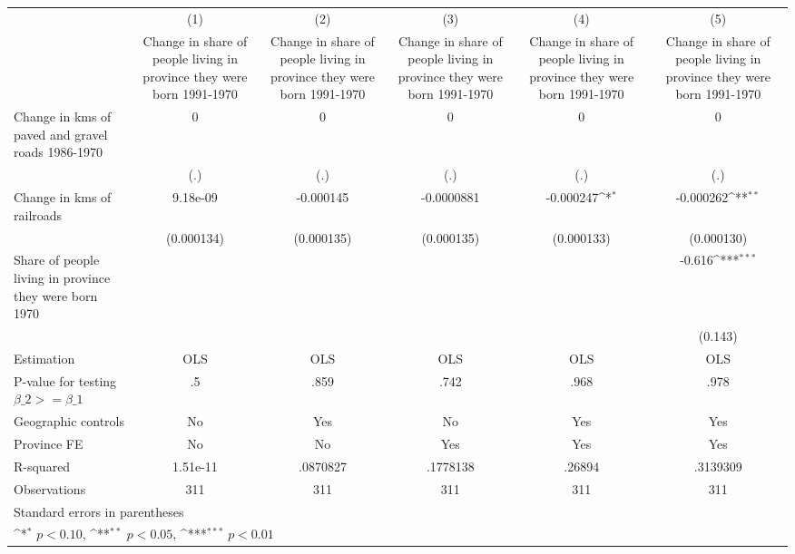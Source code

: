 {
\def\sym#1{\ifmmode^{#1}\else\(^{#1}\)\fi}
\begin{tabular}{l*{5}{c}}
\hline\hline
                    &\multicolumn{1}{c}{(1)}&\multicolumn{1}{c}{(2)}&\multicolumn{1}{c}{(3)}&\multicolumn{1}{c}{(4)}&\multicolumn{1}{c}{(5)}\\
                    &\multicolumn{1}{c}{Change in share of people living in province they were born 1991-1970}&\multicolumn{1}{c}{Change in share of people living in province they were born 1991-1970}&\multicolumn{1}{c}{Change in share of people living in province they were born 1991-1970}&\multicolumn{1}{c}{Change in share of people living in province they were born 1991-1970}&\multicolumn{1}{c}{Change in share of people living in province they were born 1991-1970}\\
\hline
Change in kms of paved and gravel roads 1986-1970&           0         &           0         &           0         &           0         &           0         \\
                    &         (.)         &         (.)         &         (.)         &         (.)         &         (.)         \\
[1em]
Change in kms of railroads&    9.18e-09         &   -0.000145         &  -0.0000881         &   -0.000247\sym{*}  &   -0.000262\sym{**} \\
                    &  (0.000134)         &  (0.000135)         &  (0.000135)         &  (0.000133)         &  (0.000130)         \\
[1em]
Share of people living in province they were born 1970&                     &                     &                     &                     &      -0.616\sym{***}\\
                    &                     &                     &                     &                     &     (0.143)         \\
\hline
Estimation          &         OLS         &         OLS         &         OLS         &         OLS         &         OLS         \\
P-value for testing $\beta\_2 >= \beta\_1$&          .5         &        .859         &        .742         &        .968         &        .978         \\
Geographic controls &          No         &         Yes         &          No         &         Yes         &         Yes         \\
Province FE         &          No         &          No         &         Yes         &         Yes         &         Yes         \\
R-squared           &    1.51e-11         &    .0870827         &    .1778138         &      .26894         &    .3139309         \\
Observations        &         311         &         311         &         311         &         311         &         311         \\
\hline\hline
\multicolumn{6}{l}{\footnotesize Standard errors in parentheses}\\
\multicolumn{6}{l}{\footnotesize \sym{*} \(p<0.10\), \sym{**} \(p<0.05\), \sym{***} \(p<0.01\)}\\
\end{tabular}
}
